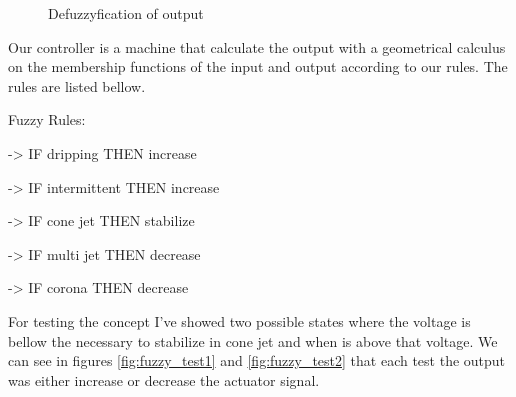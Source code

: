\begin{multicols}{2}
            \begin{figure}[H]
                \centering
                \caption{Defuzzyfication of output}
                \label{fig:fuzzy_output}
            \end{figure}

        \end{multicols}


        Our controller is a machine that calculate the output with a geometrical calculus on the membership functions of the input and output according to our rules.
        The rules are listed bellow.

        Fuzzy Rules:

        -> IF dripping THEN increase

        -> IF intermittent THEN increase

        -> IF cone jet THEN stabilize

        -> IF multi jet THEN decrease

        -> IF corona THEN decrease



        For testing the concept I've showed two possible states where the voltage is bellow the necessary to stabilize in cone jet and when is above that voltage. We can see in figures \ref{fig:fuzzy_test1} and \ref{fig:fuzzy_test2} that each test the output was either increase or decrease the actuator signal.
        
